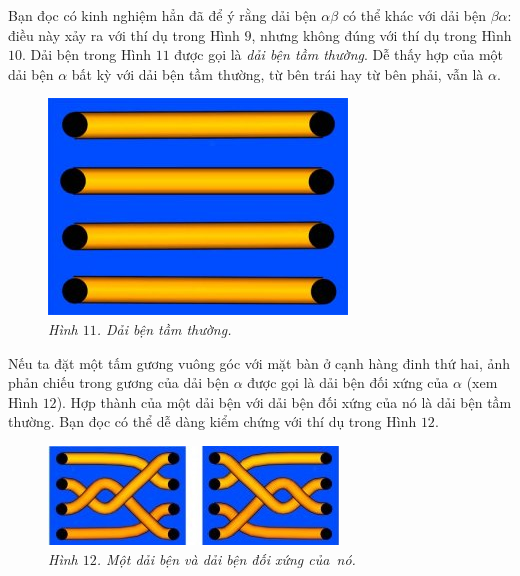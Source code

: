 \begin{multicols}{2}
\begin{figure}[H]
		\vspace*{-10pt}
	\end{figure}
	Bạn đọc có kinh nghiệm hẳn đã để ý rằng dải bện $\alpha \beta$ có thể khác với dải bện $\beta \alpha$: điều này xảy ra với thí dụ trong Hình $9$, nhưng không đúng với thí dụ trong Hình $10$.
	\vskip 0.1cm
	Dải bện trong Hình $11$ được gọi là \textit{dải bện tầm thường}. Dễ thấy hợp của một dải bện $\alpha$ bất kỳ với dải bện tầm thường, từ bên trái hay từ bên phải, vẫn là $\alpha$.
	\begin{figure}[H]
		\vspace*{-5pt}
		\centering
		\captionsetup{labelformat= empty, justification=centering}
		\includegraphics[width= 0.47\linewidth]{fig_11}
		\caption{\small\textit{\color{duongvaotoanhoc}Hình $11$. Dải bện tầm thường.}}
		\vspace*{-10pt}
	\end{figure}
	Nếu ta đặt một tấm gương vuông góc với mặt bàn ở cạnh hàng đinh thứ hai, ảnh phản chiếu trong gương của dải bện $\alpha$ được gọi là dải bện đối xứng của $\alpha$ (xem Hình $12$). Hợp thành của một dải bện với dải bện đối xứng của nó là dải bện tầm thường. Bạn đọc có thể dễ dàng kiểm chứng với thí dụ trong Hình $12$.
	\begin{figure}[H]
		\vspace*{-5pt}
		\centering
		\captionsetup{labelformat= empty, justification=centering}
		\includegraphics[width= 0.97\linewidth]{fig_12}
		\caption{\small\textit{\color{duongvaotoanhoc}Hình $12$. Một dải bện và dải bện đối xứng của~nó.}}
		\vspace*{-5pt}
	\end{figure}

\end{multicols}
